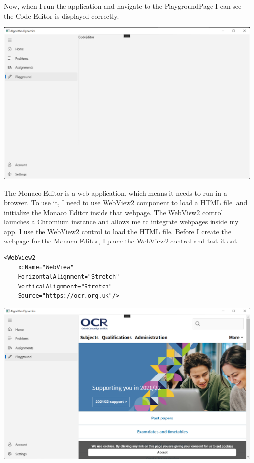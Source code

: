 \documentclass[a4paper]{report}
\begin{document}
Now, when I run the application and navigate to the PlaygroundPage I can see the Code Editor is displayed correctly.

\includegraphics[width=\textwidth, height=\textheight, keepaspectratio]{CodeEditorControl}

The Monaco Editor is a web application, which means it needs to run in a browser. To use it, I need to use WebView2 component to load a HTML file, and initialize the Monaco Editor inside that webpage. The WebView2 control launches a Chromium instance and allows me to integrate webpages inside my app. I use the WebView2 control to load the HTML file. Before I create the webpage for the Monaco Editor, I place the WebView2 control and test it out.

\begin{verbatim}
<WebView2 
    x:Name="WebView"
    HorizontalAlignment="Stretch"
    VerticalAlignment="Stretch"
    Source="https://ocr.org.uk"/>
\end{verbatim}

\includegraphics[width=\textwidth, height=\textheight, keepaspectratio]{PlaygroundPage-WebView2-Webpage}
\end{document}
